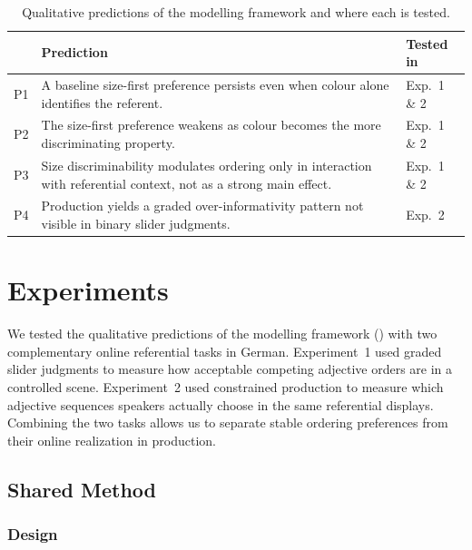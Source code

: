 \documentclass[man,floatsintext]{apa7}
\begin{document}
\begin{table}[htbp]
  \caption{Qualitative predictions of the modelling framework and where each is tested.}
  \label{tab:predictions}
  \centering
  \begin{tabularx}{\textwidth}{lXl}
    \toprule
     & \textbf{Prediction} & \textbf{Tested in} \\
    \midrule
    P1 & A baseline size-first preference persists even when colour alone identifies the referent. & Exp.\ 1 \& 2 \\
    P2 & The size-first preference weakens as colour becomes the more discriminating property. & Exp.\ 1 \& 2 \\
    P3 & Size discriminability modulates ordering only in interaction with referential context, not as a strong main effect. & Exp.\ 1 \& 2 \\
    P4 & Production yields a graded over-informativity pattern not visible in binary slider judgments. & Exp.\ 2 \\
    \bottomrule
  \end{tabularx}
\end{table}

\section{Experiments}
\label{sec:experiments}

We tested the qualitative predictions of the modelling framework () with two complementary online referential tasks in German.
Experiment~1 used graded slider judgments to measure how acceptable competing adjective orders are in a controlled scene.
Experiment~2 used constrained production to measure which adjective sequences speakers actually choose in the same referential displays.
Combining the two tasks allows us to separate stable ordering preferences from their online realization in production.

\subsection{Shared Method}

\subsubsection{Design}
\end{document}
